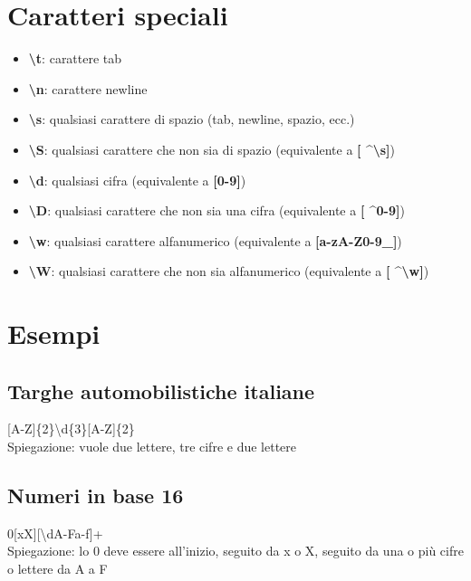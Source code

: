 \documentclass[12pt]{article}
\begin{document}
\section{Caratteri speciali}
\begin{itemize}
    \item \textbf{\textbackslash t}: carattere tab
    \item \textbf{\textbackslash n}: carattere newline
    \item \textbf{\textbackslash s}: qualsiasi carattere di spazio (tab, newline, spazio, ecc.)
    \item \textbf{\textbackslash S}: qualsiasi carattere che non sia di spazio (equivalente a \textbf{[ \textasciicircum\textbackslash s]})
    \item \textbf{\textbackslash d}: qualsiasi cifra (equivalente a \textbf{[0-9]})
    \item \textbf{\textbackslash D}: qualsiasi carattere che non sia una cifra (equivalente a \textbf{[ \textasciicircum0-9]})
    \item \textbf{\textbackslash w}: qualsiasi carattere alfanumerico (equivalente a \textbf{[a-zA-Z0-9\_]})
    \item \textbf{\textbackslash W}: qualsiasi carattere che non sia alfanumerico (equivalente a \textbf{[ \textasciicircum \textbackslash w]})
\end{itemize}
\section{Esempi}
\subsection{Targhe automobilistiche italiane}
[A-Z]\{2\}\textbackslash d\{3\}[A-Z]\{2\}\\
Spiegazione: vuole due lettere, tre cifre e due lettere
\subsection{Numeri in base 16}
0[xX][\textbackslash dA-Fa-f]+\\
Spiegazione: lo 0 deve essere all'inizio, seguito da x o X, seguito da una o più cifre o lettere da A a F
\end{document}
